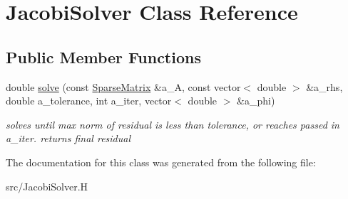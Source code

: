 \hypertarget{classJacobiSolver}{
\section{JacobiSolver Class Reference}
\label{classJacobiSolver}
}
\subsection*{Public Member Functions}
\begin{DoxyCompactItemize}
\item 
\hypertarget{classJacobiSolver_ad31dc79451b897dc75fe550162d10223}{
double \hyperlink{classJacobiSolver_ad31dc79451b897dc75fe550162d10223}{solve} (const \hyperlink{classSparseMatrix}{SparseMatrix} \&a\_\-A, const vector$<$ double $>$ \&a\_\-rhs, double a\_\-tolerance, int a\_\-iter, vector$<$ double $>$ \&a\_\-phi)}
\label{classJacobiSolver_ad31dc79451b897dc75fe550162d10223}

\begin{DoxyCompactList}\small\item\em solves until max norm of residual is less than tolerance, or reaches passed in a\_\-iter. returns final residual \item\end{DoxyCompactList}\end{DoxyCompactItemize}


The documentation for this class was generated from the following file:\begin{DoxyCompactItemize}
\item 
src/JacobiSolver.H\end{DoxyCompactItemize}
